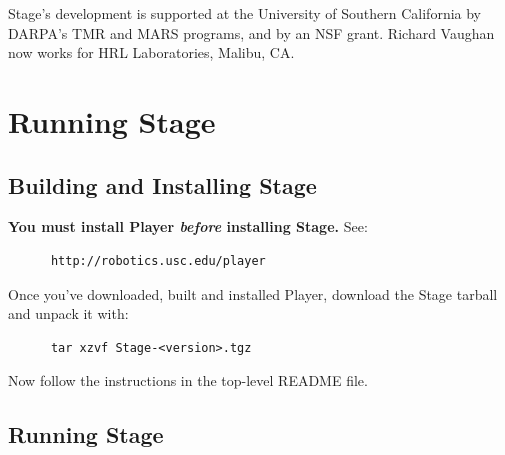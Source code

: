 \documentclass[11pt]{report}
\begin{document}
    Stage's development is supported at the University of Southern
    California by DARPA's TMR and MARS programs, and by an NSF grant.
    Richard Vaughan now works for HRL Laboratories, Malibu, CA.


\chapter{Running Stage}

  \section{Building and Installing Stage}

    {\bf You must install Player {\sl before} installing Stage.} 
    See:
      \begin{verbatim}
      http://robotics.usc.edu/player
      \end{verbatim}
    Once you've downloaded, built and installed Player, download
    the Stage tarball and unpack it with:
      \begin{verbatim}
      tar xzvf Stage-<version>.tgz
      \end{verbatim}
    Now follow the instructions in the top-level README file.

  \section{Running Stage}
\end{document}
